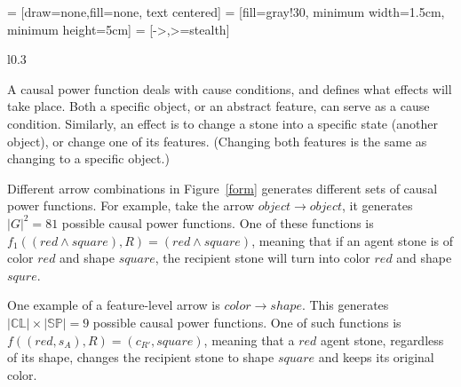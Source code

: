 \documentclass{article}
\newcommand{\colorspace}{\mathbb{CL}}
\newcommand{\shapespace}{\mathbb{SP}}
\begin{document}
 = [draw=none,fill=none, text centered]
 = [fill=gray!30, minimum width=1.5cm, minimum height=5cm]
 = [->,>=stealth]
\begin{wrapfigure}{l}{0.3\textwidth}
\begin{center}
	\caption{Formation space for $f$.}
	\label{form}
\end{center}
\end{wrapfigure}

A causal power function deals with cause conditions, and defines what effects will take place. Both a specific object, or an abstract feature, can serve as a cause condition. Similarly, an effect is to change a stone into a specific state (another object), or change one of its features. (Changing both features is the same as changing to a specific object.)


Different arrow combinations in Figure~\ref{form} generates different sets of causal power functions. For example, take the arrow $object \rightarrow object$, it generates $|G|^2 = 81$ possible causal power functions. One of these functions is $f_1((red \wedge square), R) = (red \wedge square)$, meaning that if an agent stone is of color $red$ and shape $square$, the recipient stone will turn into color $red$ and shape $squre$.

One example of a feature-level arrow is $color \rightarrow shape$. This generates $|\colorspace|\times|\shapespace|=9$ possible causal power functions. One of such functions is $f((red, s_A), R) = (c_{R'}, square)$, meaning that a $red$ agent stone, regardless of its shape, changes the recipient stone to shape $square$ and keeps its original color.
\end{document}
